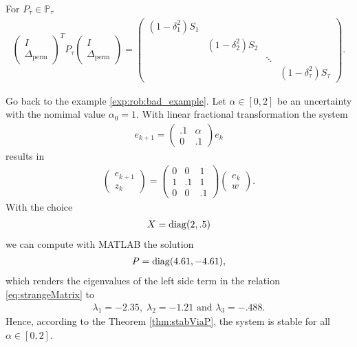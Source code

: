 For $P_\tau \in \mathbb{P}_\tau$
\begin{align}
\begin{pmatrix}
I \\ \Delta_\text{perm}
\end{pmatrix}^T
P_\tau
\begin{pmatrix}
I \\ \Delta_\text{perm}
\end{pmatrix}
= 
\begin{pmatrix}
(1 - \delta_1^2)S_1 & & &\\
& (1 - \delta_2^2) S_2 & & \\
& & \ddots & \\
& & & (1- \delta_\tau^2) S_\tau
\end{pmatrix}.
\end{align}



Go back to the example \ref{exp:rob:bad_example}. 
Let $\alpha \in [0,2]$ be an uncertainty with the nomimal value $\alpha_0 = 1$.
With linear fractional transformation the system 
\begin{align}
e_{k+1} = \begin{pmatrix}
.1 & \alpha \\ 0 &.1
\end{pmatrix}e_k
\end{align}
results in 
\begin{align}
\begin{pmatrix}
e_{k+1} \\ z_k
\end{pmatrix} = 
\begin{pmatrix}
0 & 0 & 1 \\
1 & .1 & 1 \\
0 & 0 & .1
\end{pmatrix} \begin{pmatrix}
e_k \\ w
\end{pmatrix}. 
\end{align}
With the choice 
\begin{align}
X = \operatorname*{diag}(2, .5)
\end{align}
we can compute with MATLAB the solution 
\begin{align}
P = \operatorname*{diag}(4.61, -4.61), 
\end{align}
which renders the eigenvalues of the left side term in the relation \eqref{eq:strangeMatrix} to 
\begin{align}
\lambda_1 = -2.35, \; \lambda_2 = -1.21 \text{ and } \lambda_3 = -.488.
\end{align}
Hence, according to the Theorem \ref{thm:stabViaP}, the system is stable for all $\alpha \in [0,2]$. 


